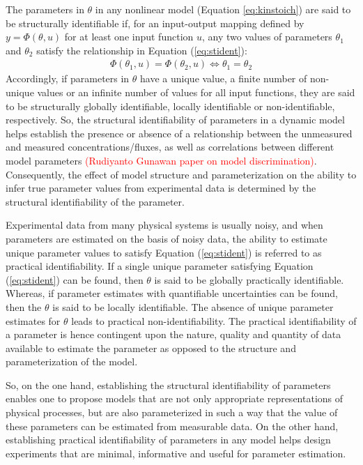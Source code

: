 \documentclass[10pt]{article}
\begin{document}
	The parameters in $\theta$ in any nonlinear model (Equation \ref{eq:kinstoich}) are said to be structurally identifiable if, for an input-output mapping defined by $y = \Phi(\theta,u)$ for at least one input function $u$, any two values of parameters $\theta_1$ and $\theta_2$ satisfy the relationship in Equation (\ref{eq:stident}):
	\begin{align}\label{eq:stident}
	\Phi(\theta_1,u) = \Phi(\theta_2,u) \iff \theta_1 = \theta_2
	\end{align}
	Accordingly, if parameters in $\theta$ have a unique value, a finite number of non-unique values or an infinite number of values for all input functions, they are said to be structurally globally identifiable, locally identifiable or non-identifiable, respectively. So, the structural identifiability of parameters in a dynamic model helps establish the presence or absence of a relationship between the unmeasured and measured concentrations/fluxes, as well as correlations between different model parameters \textcolor{red}{(Rudiyanto Gunawan paper on model discrimination)}. Consequently, the effect of model structure and parameterization on the ability to infer true parameter values from experimental data is determined by the structural identifiability of the parameter. 
		
	Experimental data from many physical systems is usually noisy, and when parameters are estimated on the basis of noisy data, the ability to estimate unique parameter values to satisfy Equation (\ref{eq:stident}) is referred to as practical identifiability. If a single unique parameter satisfying Equation (\ref{eq:stident}) can be found, then $\theta$ is said to be globally practically identifiable. Whereas, if parameter estimates with quantifiable uncertainties can be found, then the $\theta$ is said to be locally identifiable. The absence of unique parameter estimates for $\theta$ leads to practical non-identifiability. The practical identifiability of a parameter is hence contingent upon the nature, quality and quantity of data available to estimate the parameter as opposed to the structure and parameterization of the model. 
		
	So, on the one hand, establishing the structural identifiability of parameters enables one to propose models that are not only appropriate representations of physical processes, but are also parameterized in such a way that the value of these parameters can be estimated from measurable data. On the other hand, establishing practical identifiability of parameters in any model helps design experiments that are minimal, informative and useful for parameter estimation.		
\end{document}

